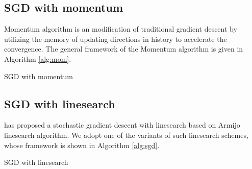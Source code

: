 \documentclass{article}
\begin{document}
\subsection{SGD with momentum}
Momentum algorithm is an modification of traditional gradient descent by utilizing the memory of updating directions in history to accelerate the convergence. The general framework of the Momentum algorithm is given in Algorithm \ref{alg:mom}.
\begin{algorithm}[H]
\caption{SGD with momentum}
\begin{algorithmic}[1]\label{alg:mom}
\ENDWHILE
{}
\end{algorithmic}
\end{algorithm}
\subsection{SGD with linesearch}
\cite{paquette2018stochastic} has proposed a stochastic gradient descent with linesearch based on Armijo linesearch algorithm. We adopt one of the variants of such linesearch schemes, whose framework is shown in Algorithm \ref{alg:sgd}.
\begin{algorithm}[H]
\caption{SGD with linesearch}
\begin{algorithmic}[1]\label{alg:sgd}
\ENDWHILE
{}
\ENDWHILE
{}
\end{algorithmic}
\end{algorithm}
\end{document}
